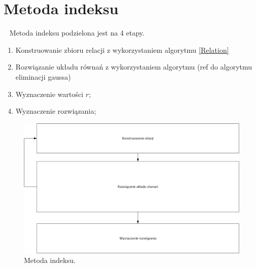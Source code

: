 \documentclass[]{article}
\begin{document}
\section{Metoda indeksu}~
	Metoda indeksu podzielona jest na 4 etapy. 
	\begin{enumerate}
		\item Konstruowanie zbioru relacji z wykorzystaniem algorytmu \ref{Relation}
		\item Rozwiązanie układu równań z wykorzystaniem algorytmu (ref do algorytmu eliminacji gaussa)
		\item Wyznaczenie wartości \(r\);
		\item Wyznaczenie rozwiązania;
	\end{enumerate}
	\begin{figure}[h]
		\begin{center}
			\includegraphics[width=15cm]{./img/schemat_1.png}
			\caption{Metoda indeksu. }
		\end{center}
	\end{figure}
\end{document}
